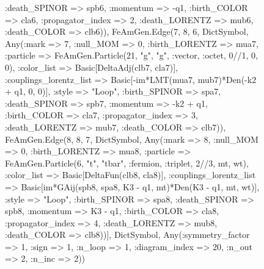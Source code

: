 \documentclass{revtex4}
\begin{document}
\begin{figure}[!htb]
\begin{center}
{:death_SPINOR => spb6, :momentum => -q1, :birth_COLOR => cla6, :propagator_index => 2, :death_LORENTZ => mub6, :death_COLOR => clb6)), FeAmGen.Edge(7, 8, 6, Dict{Symbol, Any}(:mark => 7, :null_MOM => 0, :birth_LORENTZ => mua7, :particle => FeAmGen.Particle(21, "g", "g", :vector, :octet, 0//1, 0, 0), :color_list => Basic[DeltaAdj(clb7, cla7)], :couplings_lorentz_list => Basic[-im*LMT(mua7, mub7)*Den(-k2 + q1, 0, 0)], :style => "Loop", :birth_SPINOR => spa7, :death_SPINOR => spb7, :momentum => -k2 + q1, :birth_COLOR => cla7, :propagator_index => 3, :death_LORENTZ => mub7, :death_COLOR => clb7)), FeAmGen.Edge(8, 8, 7, Dict{Symbol, Any}(:mark => 8, :null_MOM => 0, :birth_LORENTZ => mua8, :particle => FeAmGen.Particle(6, "t", "tbar", :fermion, :triplet, 2//3, mt, wt), :color_list => Basic[DeltaFun(clb8, cla8)], :couplings_lorentz_list => Basic[im*GAij(spb8, spa8, K3 - q1, mt)*Den(K3 - q1, mt, wt)], :style => "Loop", :birth_SPINOR => spa8, :death_SPINOR => spb8, :momentum => K3 - q1, :birth_COLOR => cla8, :propagator_index => 4, :death_LORENTZ => mub8, :death_COLOR => clb8))], Dict{Symbol, Any}(:symmetry_factor => 1, :sign => 1, :n_loop => 1, :diagram_index => 20, :n_out => 2, :n_inc => 2)) 
}
\end{center}
\end{figure}
\end{document}
